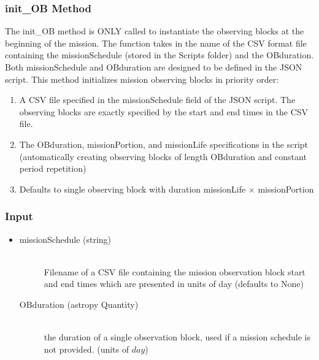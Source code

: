 \documentclass[cleanfoot]{asme2ej}
\begin{document}
\subsubsection{init\_OB Method} \label{sec:initobtask}
The init\_OB method is ONLY called to instantiate the observing blocks at the beginning of the mission. The function takes in the name of the CSV format file containing the missionSchedule (stored in the Scripts folder) and the OBduration. Both missionSchedule and OBduration are designed to be defined in the JSON script. This method initializes mission observing blocks in priority order:
\begin{enumerate}
    \item A CSV file specified in the missionSchedule field of the JSON script. The observing blocks are exactly specified by the start and end times in the CSV file.
    \item The OBduration, missionPortion, and missionLife specifications in the  script (automatically creating observing blocks of length OBduration and constant period repetition)
    \item Defaults to single observing block with duration missionLife $\times$ missionPortion
\end{enumerate}
\subsubsection*{Input}
\begin{itemize}
\item 
\begin{description}
    \item[missionSchedule (string)] \hfill \\ Filename of a CSV file containing the mission observation block start and end times which are presented in units of day (defaults to None)
    \item[OBduration (astropy Quantity)] \hfill \\ the duration of a single observation block, used if a mission schedule is not provided. (units of $day$)
\end{description}
\end{itemize}
\end{document}
